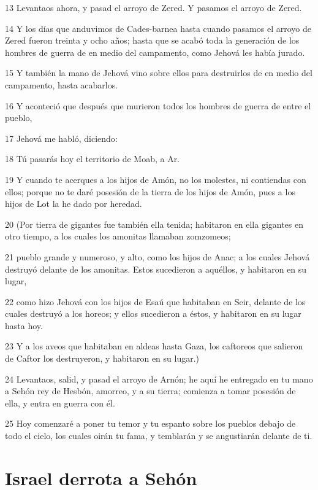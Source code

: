 \par 13 Levantaos ahora, y pasad el arroyo de Zered. Y pasamos el arroyo de Zered.
\par 14 Y los días que anduvimos de Cades-barnea hasta cuando pasamos el arroyo de Zered fueron treinta y ocho años; hasta que se acabó toda la generación de los hombres de guerra de en medio del campamento, como Jehová les había jurado. 
\par 15 Y también la mano de Jehová vino sobre ellos para destruirlos de en medio del campamento, hasta acabarlos.
\par 16 Y aconteció que después que murieron todos los hombres de guerra de entre el pueblo,
\par 17 Jehová me habló, diciendo:
\par 18 Tú pasarás hoy el territorio de Moab, a Ar.
\par 19 Y cuando te acerques a los hijos de Amón, no los molestes, ni contiendas con ellos; porque no te daré posesión de la tierra de los hijos de Amón, pues a los hijos de Lot la he dado por heredad.
\par 20 (Por tierra de gigantes fue también ella tenida; habitaron en ella gigantes en otro tiempo, a los cuales los amonitas llamaban zomzomeos;
\par 21 pueblo grande y numeroso, y alto, como los hijos de Anac; a los cuales Jehová destruyó delante de los amonitas. Estos sucedieron a aquéllos, y habitaron en su lugar,
\par 22 como hizo Jehová con los hijos de Esaú que habitaban en Seir, delante de los cuales destruyó a los horeos; y ellos sucedieron a éstos, y habitaron en su lugar hasta hoy.
\par 23 Y a los aveos que habitaban en aldeas hasta Gaza, los caftoreos que salieron de Caftor los destruyeron, y habitaron en su lugar.)
\par 24 Levantaos, salid, y pasad el arroyo de Arnón; he aquí he entregado en tu mano a Sehón rey de Hesbón, amorreo, y a su tierra; comienza a tomar posesión de ella, y entra en guerra con él.
\par 25 Hoy comenzaré a poner tu temor y tu espanto sobre los pueblos debajo de todo el cielo, los cuales oirán tu fama, y temblarán y se angustiarán delante de ti.

\section{Israel derrota a Sehón }

